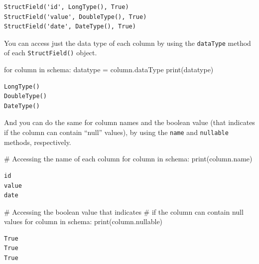 \documentclass[
  11pt,
  letterpaper,
  DIV=11,
  numbers=noendperiod]{scrreprt}
\newenvironment{Shaded}{\begin{snugshade}}{\end{snugshade}}
\newcommand{\BuiltInTok}[1]{\textcolor[rgb]{0.00,0.23,0.31}{#1}}
\newcommand{\CommentTok}[1]{\textcolor[rgb]{0.37,0.37,0.37}{#1}}
\newcommand{\ControlFlowTok}[1]{\textcolor[rgb]{0.00,0.23,0.31}{#1}}
\newcommand{\KeywordTok}[1]{\textcolor[rgb]{0.00,0.23,0.31}{#1}}
\newcommand{\NormalTok}[1]{\textcolor[rgb]{0.00,0.23,0.31}{#1}}
\newcommand{\OperatorTok}[1]{\textcolor[rgb]{0.37,0.37,0.37}{#1}}
\begin{document}
\begin{verbatim}
StructField('id', LongType(), True)
StructField('value', DoubleType(), True)
StructField('date', DateType(), True)
\end{verbatim}

You can access just the data type of each column by using the
\texttt{dataType} method of each \texttt{StructField()} object.

\begin{Shaded}
\begin{Highlighting}[]
\ControlFlowTok{for}\NormalTok{ column }\KeywordTok{in}\NormalTok{ schema:}
\NormalTok{  datatype }\OperatorTok{=}\NormalTok{ column.dataType}
  \BuiltInTok{print}\NormalTok{(datatype)}
\end{Highlighting}
\end{Shaded}

\begin{verbatim}
LongType()
DoubleType()
DateType()
\end{verbatim}

And you can do the same for column names and the boolean value (that
indicates if the column can contain ``null'' values), by using the
\texttt{name} and \texttt{nullable} methods, respectively.

\begin{Shaded}
\begin{Highlighting}[]
\CommentTok{\# Accessing the name of each column}
\ControlFlowTok{for}\NormalTok{ column }\KeywordTok{in}\NormalTok{ schema:}
  \BuiltInTok{print}\NormalTok{(column.name)}
\end{Highlighting}
\end{Shaded}

\begin{verbatim}
id
value
date
\end{verbatim}

\begin{Shaded}
\begin{Highlighting}[]
\CommentTok{\# Accessing the boolean value that indicates}
\CommentTok{\# if the column can contain null values}
\ControlFlowTok{for}\NormalTok{ column }\KeywordTok{in}\NormalTok{ schema:}
  \BuiltInTok{print}\NormalTok{(column.nullable)}
\end{Highlighting}
\end{Shaded}

\begin{verbatim}
True
True
True
\end{verbatim}
\end{document}

